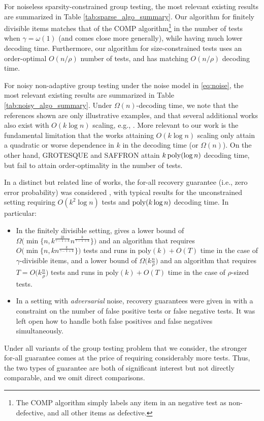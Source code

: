 For noiseless sparsity-constrained group testing, the most relevant existing results are summarized in Table \ref{tab:sparse_algo_summary}. Our algorithm for finitely divisible items matches that of the COMP algorithm\footnote{The COMP algorithm simply labels any item in an negative test as non-defective, and all other items as defective.} in the number of tests when $\gamma = \omega(1)$ (and comes close more generally), while having much lower decoding time. Furthermore, our algorithm for size-constrained tests uses an order-optimal $O(n/\rho)$ number of tests, and has matching $O(n/\rho)$ decoding time.

For noisy non-adaptive group testing under the noise model in \eqref{eq:noise}, the most relevant existing results are summarized in Table \ref{tab:noisy_algo_summary}.  Under $\Omega(n)$-decoding time, we note that the references shown are only illustrative examples, and that several additional works also exist with $O(k \log n)$ scaling, e.g., \cite{Mal78,Sca17b,Oli20a}.  More relevant to our work is the fundamental limitation that the works attaining $O(k \log n)$ scaling only attain a quadratic or worse dependence in $k$ in the decoding time (or $\Omega(n)$).  On the other hand, GROTESQUE and SAFFRON attain $k \, {\rm poly}(\log n)$ decoding time, but fail to attain order-optimality in the number of tests.

In a distinct but related line of works, the for-all recovery guarantee (i.e., zero error probability) was considered \cite{Che09,Ind10,Ngo11,Hus19,cher20}, with typical results for the unconstrained setting requiring $O(k^2 \log n)$ tests and ${\rm poly}(k \log n)$ decoding time.  In particular:
\begin{itemize}
    \item In the finitely divisible setting, \cite{Hus19} gives a lower bound of $\Omega\big(\min\big\{n,k^{\frac{2k}{\gamma-1+k}}n^{\frac{k}{\gamma-1+k}}\big\}\big)$ and an algorithm that requires $O\big(\min\big\{n,kn^{\frac{k}{\gamma-1+k}}\big\}\big)$ tests and runs in $\text{poly}(k)+O(T)$ time in the case of $\gamma$-divisible items, and a lower bound of $\Omega\big(k\frac{n}{\rho}\big)$ and an algorithm that requires $T = O\big(k\frac{n}{\rho}\big)$ tests and runs in $\text{poly}(k)+O(T)$ time in the case of $\rho$-sized tests. 
    \item In a setting with {\em adversarial} noise, recovery guarantees were given in \cite[Thms.~3.8 and 3.9]{cher20} with a constraint on the number of false positive tests or false negative tests.  It was left open how to handle both false positives and false negatives simultaneously.
\end{itemize}
Under all variants of the group testing problem that we consider, the stronger for-all guarantee comes at the price of requiring considerably more tests.  Thus, the two types of guarantee are both of significant interest but not directly comparable, and we omit direct comparisons.

